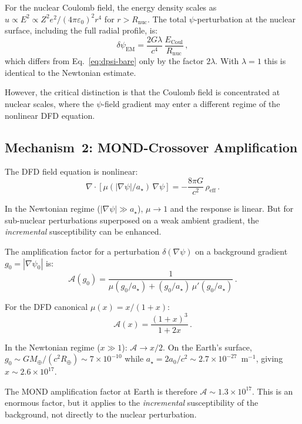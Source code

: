 \documentclass[aps,prd,twocolumn,superscriptaddress,nofootinbib]{revtex4-2}
\newcommand{\astar}{a_\star}
\newcommand{\azero}{a_0}
\newcommand{\ee}[1]{\times 10^{#1}}
\newcommand{\mufunction}{\mu}
\newcommand{\lam}{\lambda}
\newcommand{\dpsi}{\delta\psi}
\begin{document}
For the nuclear Coulomb field, the energy density scales as
$u \propto E^2 \propto Z^2e^2/(4\pi\varepsilon_0)^2 r^4$ for
$r > R_{\mathrm{nuc}}$.  The total $\psi$-perturbation at the
nuclear surface, including the full radial profile, is:
\begin{equation}\label{eq:dpsi-em}
\dpsi_{\mathrm{EM}} = \frac{2G\lam}{c^4}\,
\frac{E_{\mathrm{Coul}}}{R_{\mathrm{nuc}}}\,,
\end{equation}
which differs from Eq.~\eqref{eq:dpsi-bare} only by the factor
$2\lam$.  With $\lam = 1$ this is identical to the Newtonian
estimate.

However, the critical distinction is that the Coulomb field is
concentrated at nuclear scales, where the $\psi$-field gradient
may enter a different regime of the nonlinear DFD equation.

\subsection{Mechanism~2: MOND-Crossover Amplification}
\label{sec:mond}

The DFD field equation is nonlinear:
\begin{equation}\label{eq:dfd-field}
\nabla\cdot[\mufunction(|\nabla\psi|/\astar)\,\nabla\psi]
= -\frac{8\pi G}{c^2}\,\rho_{\mathrm{eff}}\,.
\end{equation}

In the Newtonian regime ($|\nabla\psi| \gg \astar$),
$\mufunction \to 1$ and the response is linear.  But for
sub-nuclear perturbations superposed on a weak ambient gradient,
the \emph{incremental} susceptibility can be enhanced.

The amplification factor for a perturbation $\delta(\nabla\psi)$
on a background gradient $g_0 = |\nabla\psi_0|$ is:
\begin{equation}
\mathcal{A}(g_0) = \frac{1}{\mufunction(g_0/\astar)
+ (g_0/\astar)\,\mufunction'(g_0/\astar)}\,.
\end{equation}

For the DFD canonical $\mufunction(x) = x/(1+x)$:
\begin{equation}
\mathcal{A}(x) = \frac{(1+x)^3}{1+2x}\,.
\end{equation}

In the Newtonian regime ($x \gg 1$): $\mathcal{A} \to x/2$.
On the Earth's surface, $g_0 \sim GM_\oplus/(c^2 R_\oplus)
\sim 7\ee{-10}$ while $\astar = 2\azero/c^2 \sim 2.7\ee{-27}$~m$^{-1}$,
giving $x \sim 2.6\ee{17}$.

The MOND amplification factor at Earth is therefore
$\mathcal{A} \sim 1.3\ee{17}$.  This is an enormous factor, but it
applies to the \emph{incremental} susceptibility of the background,
not directly to the nuclear perturbation.
\end{document}
